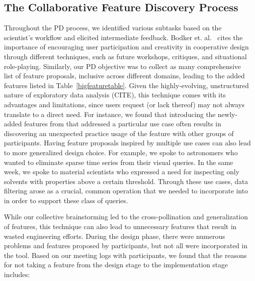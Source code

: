 {  \subsection{The Collaborative Feature Discovery Process}
  \par Throughout the PD process, we identified various subtasks based on the scientist's workflow and elicited intermediate feedback.
  Bodker et. al.~\cite{BodkerGronbaek} cites the importance of encouraging user participation and creativity in cooperative design through different techniques, such as future workshops, critiques, and situational role-playing. Similarly, our PD objective was to collect as many comprehensive list of feature proposals, inclusive across different domains, leading to the added features listed in Table~\ref{bigfeaturetable}. Given the highly-evolving, unstructured nature of exploratory data analysis (CITE), this technique comes with its advantages and limitations, since users request (or lack thereof) may not always translate to a direct need. For instance, we found that introducing the newly-added features from \zvpp that addressed a particular use case often results in discovering an unexpected practice usage of the feature with other groups of participants. Having feature proposals inspired by multiple use cases can also lead to more generalized design choice. For example, we spoke to astronomers who wanted to eliminate sparse time series from their visual queries. In the same week, we spoke to material scientists who expressed a need for inspecting only solvents with properties above a certain threshold. Through these use cases, data filtering arose as a crucial, common operation that we needed to incorporate into \zvpp in order to support these class of queries.
  \par While our collective brainstorming led to the cross-pollination and generalization of features, this technique can also lead to unnecessary features that result in wasted engineering efforts. During the design phase, there were numerous problems and features proposed by participants, but not all were incorporated in the tool. Based on our meeting logs with participants, we found that the reasons for not taking a feature from the design stage to the implementation stage includes:

}
